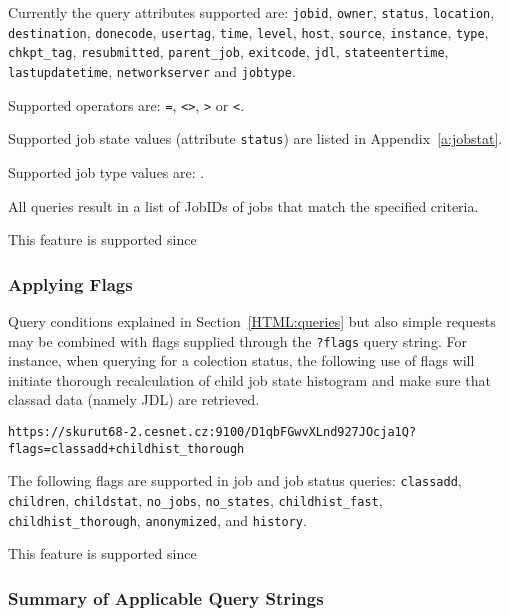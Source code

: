 {\raggedright{}Currently the query attributes supported are: \texttt{jobid}, \texttt{owner}, \texttt{status}, \texttt{location}, \texttt{destination}, \texttt{donecode}, \texttt{usertag}, \texttt{time}, \texttt{level}, \texttt{host}, \texttt{source}, \texttt{instance}, \texttt{type}, \texttt{chkpt\_tag}, \texttt{resubmitted}, \texttt{parent\_job}, \texttt{exitcode}, \texttt{jdl}, \texttt{stateentertime}, \texttt{lastupdatetime}, \texttt{networkserver} and \texttt{jobtype}.}

Supported operators are: \texttt{=}, \texttt{<>}, \texttt{>} or \texttt{<}.

Supported job state values (attribute \texttt{status}) are listed in Appendix~\ref{a:jobstat}.

{\raggedright{}Supported job type values are: \jobtypenames.}

All queries result in a list of JobIDs of jobs that match the specified criteria.

This feature is supported since 

\subsubsection{Applying Flags}
\label{HTML:flags}

Query conditions explained in Section~\ref{HTML:queries} but also simple requests may be combined with flags supplied through the \texttt{?flags} query string. For instance, when querying for a colection status, the following use of flags will initiate thorough recalculation of child job state histogram and make sure that classad data (namely JDL) are retrieved.

\begin{verbatim}
https://skurut68-2.cesnet.cz:9100/D1qbFGwvXLnd927JOcja1Q?flags=classadd+childhist_thorough
\end{verbatim}

The following flags are supported in job and job status queries:
\texttt{classadd},
\texttt{children},
\texttt{childstat},
\texttt{no\_jobs},
\texttt{no\_states},
\texttt{childhist\_fast},
\texttt{childhist\_thorough},
\texttt{anonymized}, and
\texttt{history}.

This feature is supported since 



\subsubsection{Summary of Applicable Query Strings}
\label{HTML:querystrings}

